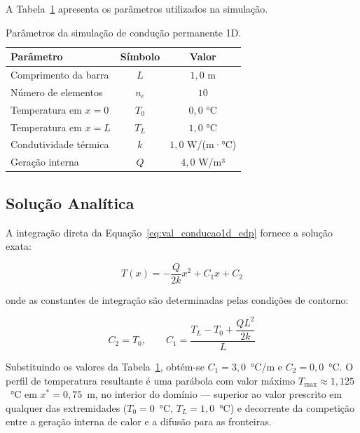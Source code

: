 A Tabela~\ref{tab:val_conducao1d_params} apresenta os parâmetros utilizados na simulação.

\begin{table}[htbp]
    \centering
    \caption{Parâmetros da simulação de condução permanente 1D.}
    \label{tab:val_conducao1d_params}
    \begin{tabular}{lcc}
        \hline
        \textbf{Parâmetro} & \textbf{Símbolo} & \textbf{Valor} \\
        \hline
        Comprimento da barra   & $L$    & $1{,}0$ m     \\
        Número de elementos    & $n_e$  & $10$          \\
        Temperatura em $x=0$   & $T_0$  & $0{,}0$ °C    \\
        Temperatura em $x=L$   & $T_L$  & $1{,}0$ °C    \\
        Condutividade térmica  & $k$    & $1{,}0$ W/(m·°C) \\
        Geração interna        & $Q$    & $4{,}0$ W/m³   \\
        \hline
    \end{tabular}
\end{table}

\subsection{Solução Analítica}

A integração direta da Equação~\eqref{eq:val_conducao1d_edp} fornece a solução exata:

\begin{equation}
    T(x) = -\frac{Q}{2k} x^2 + C_1 x + C_2
    \label{eq:val_conducao1d_analitica}
\end{equation}

\noindent onde as constantes de integração são determinadas pelas condições de contorno:

\begin{equation}
    C_2 = T_0, \qquad C_1 = \frac{T_L - T_0 + \dfrac{Q L^2}{2k}}{L}
    \label{eq:val_conducao1d_constantes}
\end{equation}

Substituindo os valores da Tabela~\ref{tab:val_conducao1d_params}, obtém-se $C_1 = 3{,}0$~°C/m e $C_2 = 0{,}0$~°C. O perfil de temperatura resultante é uma parábola com valor máximo $T_{\max} \approx 1{,}125$~°C em $x^{*} = 0{,}75$~m, no interior do domínio --- superior ao valor prescrito em qualquer das extremidades ($T_0 = 0$~°C, $T_L = 1{,}0$~°C) e decorrente da competição entre a geração interna de calor e a difusão para as fronteiras.

